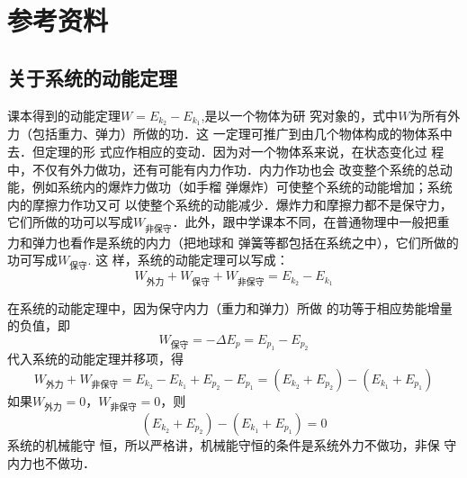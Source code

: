 \section{参考资料}
\subsection{关于系统的动能定理}
课本得到的动能定理$W=E_{k_2}-E_{k_1}$,是以一个物体为研
究对象的，式中$W$为所有外力（包括重力、弹力）所做的功．这
一定理可推广到由几个物体构成的物体系中去．但定理的形
式应作相应的变动．因为对一个物体系来说，在状态变化过
程中，不仅有外力做功，还有可能有内力作功．内力作功也会
改变整个系统的总动能，例如系统内的爆炸力做功（如手榴
弹爆炸）可使整个系统的动能增加；系统内的摩擦力作功又可
以使整个系统的动能减少．爆炸力和摩擦力都不是保守力，
它们所做的功可以写成$W_{\text{非保守}}$．此外，跟中学课本不同，在普通物理中一般把重力和弹力也看作是系统的内力（把地球和
弹簧等都包括在系统之中），它们所做的功可写成$W_{\text{保守}}$. 这
样，系统的动能定理可以写成：
\[W_{\text{外力}}+W_{\text{保守}}+W_{\text{非保守}}=E_{k_2}-E_{k_1}\]

在系统的动能定理中，因为保守内力（重力和弹力）所做
的功等于相应势能增量的负值，即
\[W_{\text{保守}}=-\Delta E_p=E_{p_1}-E_{p_2}\]
代入系统的动能定理并移项，得
\[W_{\text{外力}}+W_{\text{非保守}}=E_{k_2}-E_{k_1}+E_{p_2}-E_{p_1}=(E_{k_2}+E_{p_2})-(E_{k_1}+E_{p_1})\]
如果$W_{\text{外力}}=0$，$W_{\text{非保守}}=0$，则
\[(E_{k_2}+E_{p_2})-(E_{k_1}+E_{p_1})=0\]
系统的机械能守
恒，所以严格讲，机械能守恒的条件是系统外力不做功，非保
守内力也不做功．

